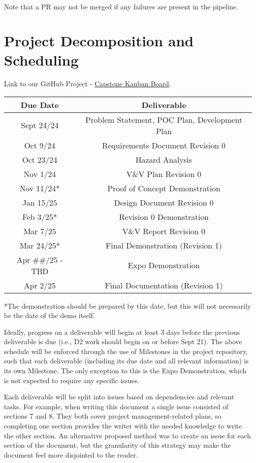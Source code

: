 \documentclass{article}
\begin{document}
\noindent Note that a PR may not be merged if any failures are present in the pipeline.

\section{Project Decomposition and Scheduling}
Link to our GitHub Project - \href{https://github.com/users/emilyperica/projects/1}{Capstone Kanban Board}.

\begin{center}
  \begin{tabular}{ |c|c| } 
    \hline
      \textbf{Due Date} & \textbf{Deliverable} \\
    \hline
      Sept 24/24 & Problem Statement, POC Plan, Development Plan \\
    \hline
      Oct 9/24 & Requirements Document Revision 0 \\
    \hline
      Oct 23/24 & Hazard Analysis \\
    \hline
      Nov 1/24 & V\&V Plan Revision 0 \\
    \hline
      Nov 11/24* & Proof of Concept Demonstration \\
    \hline
      Jan 15/25 & Design Document Revision 0 \\
    \hline
      Feb 3/25* & Revision 0 Demonstration \\
    \hline
      Mar 7/25 & V\&V Report Revision 0 \\
    \hline
      Mar 24/25* & Final Demonstration (Revision 1) \\
    \hline
      Apr \#\#/25 - TBD & Expo Demonstration \\
    \hline
      Apr 2/25 & Final Documentation (Revision 1) \\
    \hline
  \end{tabular}
\end{center}
*The demonstration should be prepared by this date, but this will not necessarily be the date of the demo itself.

Ideally, progress on a deliverable will begin at least 3 days before the previous deliverable is due (i.e., D2 work should begin on or before Sept 21). 
The above schedule will be enforced through the use of Milestones in the project repository, such that each deliverable (including its due date and all relevant information) 
is its own Milestone. The only exception to this is the Expo Demonstration, which is not expected to require any specific issues.

Each deliverable will be split into issues based on dependencies and relevant tasks. For example, when writing this document a single issue consisted of sections 7 and 8. 
They both cover project management-related plans, so completing one section provides the writer with the needed knowledge to write the other section. An alternative proposed 
method was to create an issue for each section of the document, but the granularity of this strategy may make the document feel more disjointed to the reader.
\end{document}
